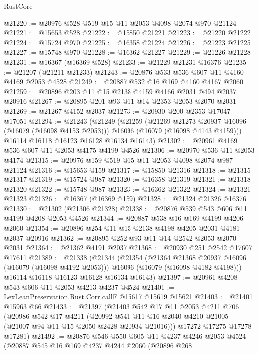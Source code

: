 \begin{lexlean}{RustCore}
\begin{coremodule}
@21220 := @20976 @528 @519 @15 @11 @2053 @4098 @2074 @970 @21124
@21221 := @15653 @528
@21222 := @15850 @21221
@21223 := @21220 @21222
@21224 := @15724 @970
@21225 := @16358 @21224
@21226 := @21223 @21225
@21227 := @15748 @970
@21228 := @16362 @21227
@21229 := @21226 @21228
@21231 := @16367 (@16369 @528)
@21233 := @21229 @21231 @16376
@21235 := @21207 (@21211 @21233)
@21243 := @20876 @533 @536 @607 @11 @4160 @4169 @2053 @4528
@21249 := @20887 @532 @16 @169 @4160 @4167 @2060
@21259 := @20896 @203 @11 @15 @2138 @4159 @4166 @2031 @494 @2037 @20916
@21267 := @20895 @201 @93 @11 @14 @2353 @2053 @2070 @2031
@21269 := @21267 @4152 @2037
@21273 := @20930 @200 @2353 @17047 @17051
@21294 := @21243
    (@21249
      (@21259
        (@21269 @21273 @20937 @16096 (@16079 (@16098 @4153 @2053)))
        @16096
        (@16079 (@16098 @4143 @4159)))
      @16114
      @16118
      @16123
      @16128
      @16134
      @16143)
@21302 := @20961 @4169 @536 @607 @11 @2053 @4175 @4199 @4526
@21306 := @20970 @536 @11 @2053 @4174
@21315 := @20976 @159 @519 @15 @11 @2053 @4098 @2074 @987 @21124
@21316 := @15653 @159
@21317 := @15850 @21316
@21318 := @21315 @21317
@21319 := @15724 @987
@21320 := @16358 @21319
@21321 := @21318 @21320
@21322 := @15748 @987
@21323 := @16362 @21322
@21324 := @21321 @21323
@21326 := @16367 (@16369 @159)
@21328 := @21324 @21326 @16376
@21330 := @21302 (@21306 @21328)
@21338 := @20876 @539 @543 @606 @11 @4199 @4208 @2053 @4526
@21344 := @20887 @538 @16 @169 @4199 @4206 @2060
@21354 := @20896 @254 @11 @15 @2138 @4198 @4205 @2031 @4181 @2037 @20916
@21362 := @20895 @252 @93 @11 @14 @2542 @2053 @2070 @2031
@21364 := @21362 @4191 @2037
@21368 := @20930 @251 @2542 @17607 @17611
@21389 := @21338
    (@21344
      (@21354
        (@21364 @21368 @20937 @16096 (@16079 (@16098 @4192 @2053)))
        @16096
        (@16079 (@16098 @4182 @4198)))
      @16114
      @16118
      @16123
      @16128
      @16134
      @16143)
@21397 := @20961 @4208 @543 @606 @11 @2053 @4213 @4237 @4524
@21401 := LexLeanPreservation.Rust.Corr.callF @15617 @15619 @15621
@21403 := @21401 @15963 @66
@21433 := @21397
    (@21403
      @542
      @17
      @11
      @2053
      @4211
      @706
      (@20986
        @542
        @17
        @4211
        (@20992 @541 @11 @16 @2040 @4210 @21005 (@21007 @94 @11 @15 @2050 @2428 @20934 @21016)))
      @17272
      @17275
      @17278
      @17281)
@21492 := @20876
    @546
    @550
    @605
    @11
    @4237
    @4246
    @2053
    @4524
    (@20887
      @545
      @16
      @169
      @4237
      @4244
      @2060
      (@20896
        @268

\end{coremodule}
\end{lexlean}
